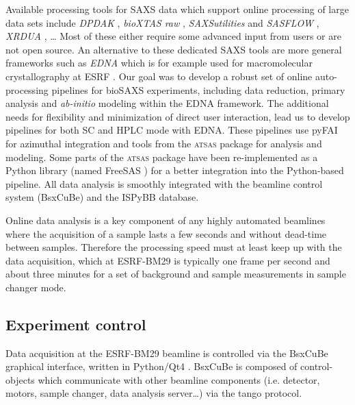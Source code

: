 \documentclass[preprint,pdf]{iucr}              %
\begin{document}
Available processing tools for SAXS data which support online processing of
large data sets include \textit{DPDAK} \cite{DPDAK}, \textit{bioXTAS raw}
\cite{BioXTASraw}, \textit{SAXSutilities} \cite{SAXSUtilities} and
\textit{SASFLOW} \cite{X33P,P12},  \textit{XRDUA} \cite{xrdua}, \ldots
Most of these either require some advanced input from users or are not open source.
An alternative to these dedicated SAXS tools are more general frameworks such as
\textit{EDNA} which is for example used for macromolecular crystallography at
ESRF \cite{EDNA}.
Our goal was to develop a robust set of online auto-processing pipelines
for bioSAXS experiments, including data reduction, primary analysis and
\textit{ab-initio} modeling  within the EDNA framework.
The additional needs for flexibility and minimization of
direct user interaction, lead us to develop pipelines for both SC and HPLC mode with EDNA.
These pipelines use pyFAI for azimuthal integration \cite{pyFAI} and tools
from the \textsc{atsas} package \cite{ATSAS1,ATSAS2} for analysis and modeling.
Some parts of the \textsc{atsas} package have been re-implemented as a Python
library (named FreeSAS \cite{freesas}) for a better integration into the
Python-based pipeline.
All data analysis is smoothly integrated with the beamline control system
(BsxCuBe) and the ISPyBB \cite{ISPYBB} database.


Online data analysis is a key component of any highly automated beamlines
where the acquisition of a sample lasts a few seconds and without dead-time between samples.
Therefore the processing speed must at least keep up with the data acquisition, which
at ESRF-BM29 is typically one frame per second and about three minutes for a set
of background and sample measurements in sample changer mode.


\subsection{Experiment control}
Data acquisition at the ESRF-BM29 beamline is controlled via the BsxCuBe
graphical interface, written in Python/Qt4 \cite{pyqt}.
BsxCuBe is composed of control-objects which communicate with other beamline
components (i.e. detector, motors, sample changer, data analysis server\ldots)
via the tango protocol\cite{tango}.

\end{document}
